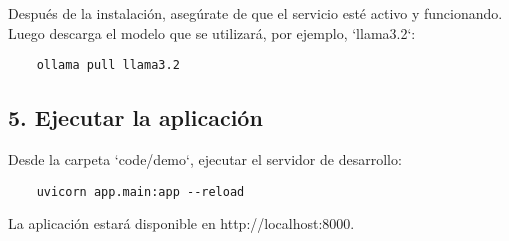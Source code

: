 Después de la instalación, asegúrate de que el servicio esté activo y funcionando. Luego descarga el modelo que se utilizará, por ejemplo, `llama3.2`:

\begin{lstlisting}
	ollama pull llama3.2
\end{lstlisting}

\subsection*{5. Ejecutar la aplicación}

Desde la carpeta `code/demo`, ejecutar el servidor de desarrollo:

\begin{lstlisting}
	uvicorn app.main:app --reload
\end{lstlisting}

La aplicación estará disponible en http://localhost:8000.